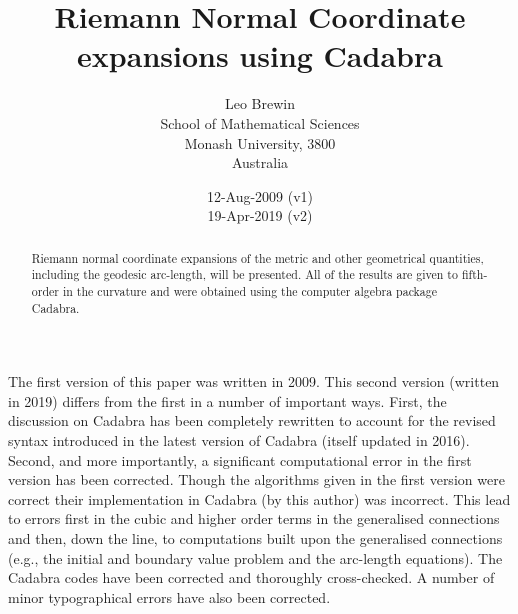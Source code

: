 \documentclass[a4paper,12pt]{article}
\numberwithin{equation}{section}
\begin{document}
\title{\bfseries Riemann Normal Coordinate expansions using Cadabra}
\author{%
Leo Brewin\\[10pt]%
School of Mathematical Sciences\\%
Monash University, 3800\\%
Australia}
\date{12-Aug-2009 (v1)\\
      19-Apr-2019 (v2)}%

\maketitle

\begin{abstract}
\noindent
%
Riemann normal coordinate expansions of the metric and other geometrical quantities,
including the geodesic arc-length, will be presented. All of the results are given to
fifth-order in the curvature and were obtained using the computer algebra package Cadabra.

\end{abstract}

The first version of this paper was written in 2009. This second version (written in 2019)
differs from the first in a number of important ways. First, the discussion on Cadabra has
been completely rewritten to account for the revised syntax introduced in the latest version
of Cadabra (itself updated in 2016). Second, and more importantly, a significant
computational error in the first version has been corrected. Though the algorithms given in
the first version were correct their implementation in Cadabra (by this author) was
incorrect. This lead to errors first in the cubic and higher order terms in the generalised
connections and then, down the line, to computations built upon the generalised connections
(e.g., the initial and boundary value problem and the arc-length equations). The Cadabra
codes have been corrected and thoroughly cross-checked. A number of minor typographical
errors have also been corrected.
\EndNote
\end{document}
